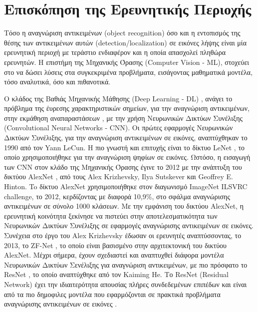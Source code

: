 \chapter{Επισκόπηση της Ερευνητικής Περιοχής}
\label{chapter:sota}
Τόσο η αναγνώριση αντικειμένων (object recognition) όσο και η εντοπισμός
της θέσης των αντικειμένων αυτών (detection/localization) σε εικόνες λήψης
είναι μία ερευνητική περιοχή με τεράστιο ενδιαφέρον και
η οποία απασχολεί πληθώρα ερευνητών. Η επιστήμη της Μηχανικής Όρασης (Computer Vision - ML),
στοχεύει στο να δώσει λύσεις στα συγκεκριμένα προβλήματα, εισάγοντας μαθηματικά
μοντέλα, τόσο αναλυτικά, όσο και πιθανοτικά.

O κλάδος της Βαθιάς Μηχανικής Mάθησης (Deep Learning - DL) \cite{Goodfellow-et-al-2016-Book},
ανάγει το πρόβλημα της έυρεσης χαρακτηριστικών σημείων, για την αναγνώριση αντικειμένων,
στην εκμάθηση αναπαραστάσεων \cite{bengio2013representation},
με την χρήση Νευρωνικών Δικτύων Συνέλιξης (Convolutional Neural Networks - CNN).
Οι πρώτες εφαρμογές Νευρωνικών Δικτύων Συνέλιξης, για την αναγνώριση αντικειμένων
σε εικόνες, αναπτύχθηκαν το 1990 από τον Yann LeCun.
Η πιο γνωστή και επιτυχής είναι το δίκτυο LeNet \cite{lecun1998gradient}, το οποίο
χρησιμοποιήθηκε για την αναγνώριση ψηφίων σε εικόνες.
Ωστόσο, η εισαγωγή των CNN στον κλάδο της Μηχανικής Όρασης έγινε το 2012 με
την ανάπτυξη του δικτύου AlexNet \cite{NIPS2012_4824}, από τους Alex Krizhevsky,
Ilya Sutskever και Geoffrey E. Hinton. To δίκτυο AlexNet χρησιμοποιήθηκε
στον διαγωνισμό ImageNet ILSVRC challenge, το 2012, κερδίζοντας με διαφορά
10,9\%, στο σφάλμα αναγνώρισης αντικειμένων σε σύνολο 1000 κλάσεων.
Με την εμφάνιση του δικτύου AlexNet, η ερευνητική κοινότητα ξεκίνησε να
πιστεύει στην αποτελεσματικότητα των Νευρωνικών Δικτύων Συνέλιξης σε εφαρμογές αναγνώρισης
αντικειμένων σε εικόνες. Συνέχεια στο έργο του Alex Krizhevsky έδωσαν οι
ερευνητές αναπτύσσοντας, το 2013, το ZF-Net \cite{DBLP:journals/corr/ZeilerF13}, το οποίο είναι
βασισμένο στην αρχιτεκτονική του δικτύου AlexNet. Μέχρι σήμερα, έχουν σχεδιαστεί
και αναπτυχθεί διάφορα μοντέλα Νευρωνικών Δικτύων Σενέλιξης για
αναγνώριση αντικειμένων, με πιο πρόσφατο το ResNet \cite{DBLP:journals/corr/HeZRS15},
το οποίο αναπτύχθηκε από τον Kaiming He. Το ResNet (Residual Network) έχει την
ιδιαιτερότητα απουσίας πλήρες συνδεδεμένων επιπέδων και είναι από τα πιο δημοφιλες
μοντέλα που εφαρμόζονται σε πρακτικά προβλήματα αναγνώρισης αντικειμένων σε
εικόνες \cite{DBLP:journals/corr/HeZR016}.

